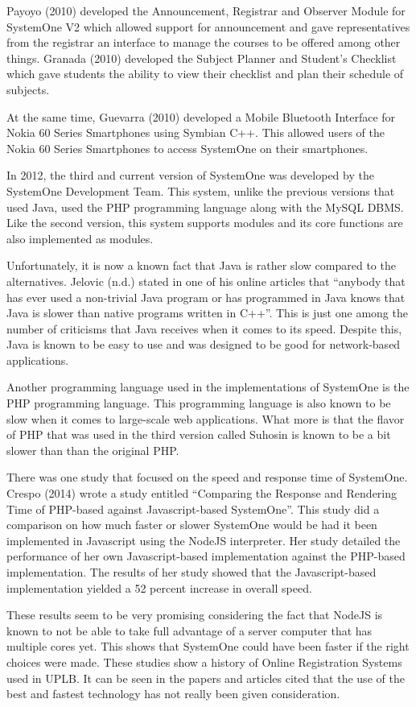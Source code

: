 \documentclass{sigchi}
\begin{document}
Payoyo (2010) developed the Announcement, Registrar and Observer Module for
SystemOne V2 which allowed support for announcement and gave representatives from the
registrar an interface to manage the courses to be offered among other things. Granada (2010)
developed the Subject Planner and Student’s Checklist which gave students the ability to view
their checklist and plan their schedule of subjects.

At the same time, Guevarra (2010) developed a Mobile Bluetooth Interface for Nokia 60
Series Smartphones using Symbian C++. This allowed users of the Nokia 60 Series Smartphones
to access SystemOne on their smartphones.

In 2012, the third and current version of SystemOne was developed by the SystemOne
Development Team. This system, unlike the previous versions that used Java, used the PHP
programming language along with the MySQL DBMS. Like the second version, this system
supports modules and its core functions are also implemented as modules.

Unfortunately, it is now a known fact that Java is rather slow compared to the alternatives.
Jelovic (n.d.) stated in one of his online articles that “anybody that has ever used a non-trivial
Java program or has programmed in Java knows that Java is slower than native programs written
in C++”. This is just one among the number of criticisms that Java receives when it comes to its
speed. Despite this, Java is known to be easy to use and was designed to be good for
network-based applications.

Another programming language used in the implementations of SystemOne is the PHP
programming language. This programming language is also known to be slow when it comes to
large-scale web applications. What more is that the flavor of PHP that was used in the third
version called Suhosin is known to be a bit slower than than the original PHP.

There was one study that focused on the speed and response time of SystemOne. Crespo
(2014) wrote a study entitled “Comparing the Response and Rendering Time of PHP-based
against Javascript-based SystemOne”. This study did a comparison on how much faster or slower
SystemOne would be had it been implemented in Javascript using the NodeJS interpreter. Her
study detailed the performance of her own Javascript-based implementation against the
PHP-based implementation. The results of her study showed that the Javascript-based
implementation yielded a 52 percent increase in overall speed.

These results seem to be very promising considering the fact that NodeJS is known to not be
able to take full advantage of a server computer that has multiple cores yet. This shows that
SystemOne could have been faster if the right choices were made.
These studies show a history of Online Registration Systems used in UPLB. It can be seen in
the papers and articles cited that the use of the best and fastest technology has not really been
given consideration.

% 
% 

\cleardoublepage
\end{document}
